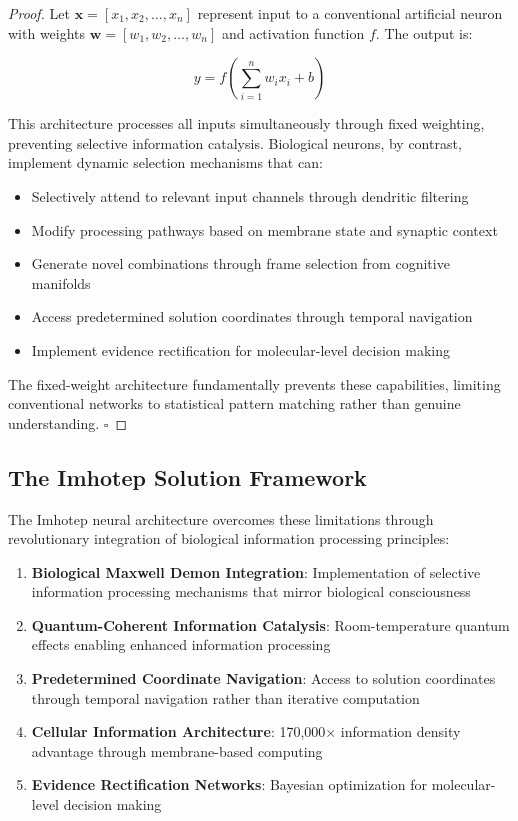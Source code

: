 \documentclass[12pt,a4paper]{article}
\theoremstyle{remark}
\begin{document}
\begin{proof}
Let $\mathbf{x} = [x_1, x_2, \ldots, x_n]$ represent input to a conventional artificial neuron with weights $\mathbf{w} = [w_1, w_2, \ldots, w_n]$ and activation function $f$. The output is:

\begin{equation}
y = f\left(\sum_{i=1}^{n} w_i x_i + b\right)
\end{equation}

This architecture processes all inputs simultaneously through fixed weighting, preventing selective information catalysis. Biological neurons, by contrast, implement dynamic selection mechanisms that can:

\begin{itemize}
\item Selectively attend to relevant input channels through dendritic filtering
\item Modify processing pathways based on membrane state and synaptic context
\item Generate novel combinations through frame selection from cognitive manifolds
\item Access predetermined solution coordinates through temporal navigation
\item Implement evidence rectification for molecular-level decision making
\end{itemize}

The fixed-weight architecture fundamentally prevents these capabilities, limiting conventional networks to statistical pattern matching rather than genuine understanding. $\square$
\end{proof}

\subsection{The Imhotep Solution Framework}

The Imhotep neural architecture overcomes these limitations through revolutionary integration of biological information processing principles:

\begin{enumerate}
\item \textbf{Biological Maxwell Demon Integration}: Implementation of selective information processing mechanisms that mirror biological consciousness
\item \textbf{Quantum-Coherent Information Catalysis}: Room-temperature quantum effects enabling enhanced information processing
\item \textbf{Predetermined Coordinate Navigation}: Access to solution coordinates through temporal navigation rather than iterative computation
\item \textbf{Cellular Information Architecture}: 170,000× information density advantage through membrane-based computing
\item \textbf{Evidence Rectification Networks}: Bayesian optimization for molecular-level decision making
\end{enumerate}
\end{document}
